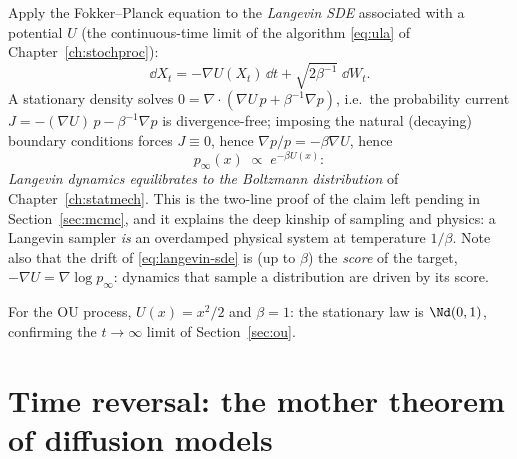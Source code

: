 Apply the Fokker--Planck equation to the \emph{Langevin SDE} associated with
a potential $U$ (the continuous-time limit of the algorithm
\eqref{eq:ula} of Chapter~\ref{ch:stochproc}):
\begin{equation}
  \dd X_t = -\nabla U(X_t)\,\dd t + \sqrt{2\beta^{-1}}\;\dd W_t .
  \label{eq:langevin-sde}
\end{equation}
A stationary density solves
$0 = \nabla \cdot ( \nabla U\, p + \beta^{-1} \nabla p )$, i.e.\ the
probability current $J = -(\nabla U)\,p - \beta^{-1}\nabla p$ is
divergence-free; imposing the natural (decaying) boundary conditions forces
$J \equiv 0$, hence $\nabla p / p = -\beta \nabla U$, hence
\begin{equation}
  p_\infty(x) \;\propto\; e^{-\beta U(x)} :
  \label{eq:langevin-boltzmann}
\end{equation}
\emph{Langevin dynamics equilibrates to the Boltzmann distribution} of
Chapter~\ref{ch:statmech}. This is the two-line proof of the claim left
pending in Section~\ref{sec:mcmc}, and it explains the deep kinship of
sampling and physics: a Langevin sampler \emph{is} an overdamped physical
system at temperature $1/\beta$. Note also that the drift of
\eqref{eq:langevin-sde} is (up to $\beta$) the \emph{score} of the target,
$-\nabla U = \nabla \log p_\infty$: dynamics that sample a distribution are
driven by its score.

For the OU process, $U(x) = x^2/2$ and $\beta = 1$: the stationary law is
$\Nd(0,1)$, confirming the $t \to \infty$ limit of
Section~\ref{sec:ou}.

\section{Time reversal: the mother theorem of diffusion models}
\label{sec:reversal}

